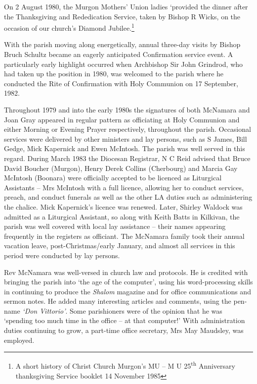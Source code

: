 On 2 August 1980, the Murgon Mothers' Union ladies `provided the dinner after the Thanksgiving and Rededication Service, taken by Bishop R Wicks, on the occasion of our church's Diamond Jubilee.\footnote{A short history of Christ Church Murgon's MU -- M U 25\textsuperscript{th} Anniversary thanksgiving Service booklet 14 November 1985}


With the parish moving along energetically, annual three-day visits by Bishop Bruch Schultz became an eagerly anticipated Confirmation service event. A particularly early highlight occurred when Archbishop Sir John Grindrod, who had taken up the position in 1980, was welcomed to the parish where he conducted the Rite of Confirmation with Holy Communion on 17 September, 1982.



Throughout 1979 and into the early 1980s the signatures of both McNamara and Joan Gray appeared in regular pattern as officiating at Holy Communion and either Morning or Evening Prayer respectively, throughout the parish. Occasional services were delivered by other ministers and lay persons, such as S James, Bill Gedge, Mick Kapernick and Ewen McIntosh. The parish was well served in this regard. During March 1983 the Diocesan Registrar, N C Reid advised that Bruce David Boucher (Murgon), Henry Derek Collins (Cherbourg) and Marcia Gay McIntosh (Boonara) were officially accepted to be licenced as Liturgical Assistants -- Mrs McIntosh with a full licence, allowing her to conduct services, preach, and conduct funerals as well as the other LA duties such as administering the chalice. Mick Kapernick's licence was renewed. Later, Shirley Waldock was admitted as a Liturgical Assistant, so along with Keith Batts in Kilkivan, the parish was well covered with local lay assistance -- their names appearing frequently in the registers as officiant. The McNamara family took their annual vacation leave, post-Christmas/early January, and almost all services in this period were conducted by lay persons.



Rev McNamara was well-versed in church law and protocols. He is credited with bringing the parish into `the age of the computer', using his word-processing skills in continuing to produce the \emph{Shalom} magazine and for office communications and sermon notes. He added many interesting articles and comments, using the pen-name \emph{`Don Vittorio'}. Some parishioners were of the opinion that he was `spending too much time in the office -- at that computer!' With administration duties continuing to grow, a part-time office secretary, Mrs May Maudsley, was employed.



